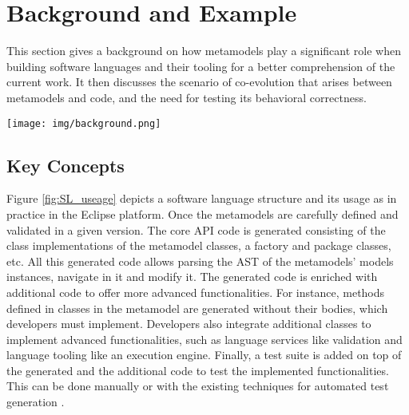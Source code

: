 \section{Background and Example}
\label{sec_background}




This section gives a background on how metamodels play a significant role when building software languages and their tooling for a better comprehension of the current work. It then discusses the scenario of co-evolution that arises between metamodels and code, and the need for testing its behavioral correctness. 

\begin{figure*}[tb]
\centering
\texttt{[image: img/background.png]}
\caption{Evolution of metamodels and related artifacts of a software language}
\label{fig:SL_useage}
\end{figure*}


\subsection{Key Concepts}

Figure \ref{fig:SL_useage} depicts a software language structure and its usage as in practice in the Eclipse platform.  
%
Once the metamodels are carefully defined and validated in a given version. The core API code is generated \cite{steinberg2008emf} consisting of the class implementations of the metamodel classes, a factory and package classes, etc. All this generated code allows parsing the AST of the metamodels' models instances, navigate in it and modify it. 
The generated code is enriched with additional code to offer more advanced functionalities. For instance, methods defined in classes in the metamodel are generated without their bodies, which developers must implement. %
Developers also integrate additional classes to implement advanced functionalities, such as language services like validation and language tooling like an execution engine. %
%
Finally, a test suite is added on top of the generated and the additional code to test the implemented functionalities. This can be done manually or with the existing techniques for automated test generation \cite{fraser2011evosuite,mcminn2004search,beyer2022advances}. 

